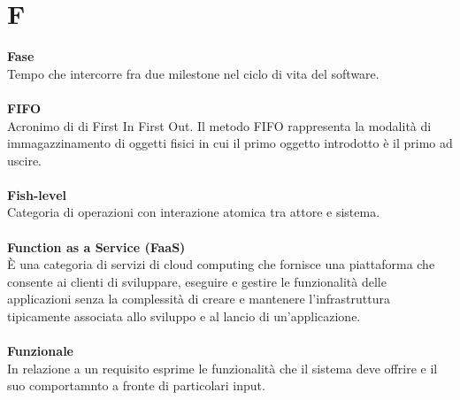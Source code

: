 \section{F}
\textbf{Fase}\\
Tempo che intercorre fra due milestone nel ciclo di vita del software. \\ \\
\textbf{FIFO}\\
Acronimo di di First In First Out. Il metodo FIFO rappresenta la modalità di immagazzinamento di oggetti fisici in cui il primo oggetto introdotto è il primo ad uscire. \\ \\
\textbf{Fish-level}\\
Categoria di operazioni con interazione atomica tra attore e sistema. \\ \\
\textbf{Function as a Service (FaaS)}\\
È una categoria di servizi di cloud computing che fornisce una piattaforma che consente ai clienti di sviluppare, eseguire e gestire le funzionalità delle applicazioni senza la complessità di creare e mantenere l'infrastruttura tipicamente associata allo sviluppo e al lancio di un'applicazione. \\ \\
\textbf{Funzionale}\\
In relazione a un requisito esprime le funzionalità che il sistema deve offrire e il suo comportamnto a fronte di particolari input.\\ 
\clearpage